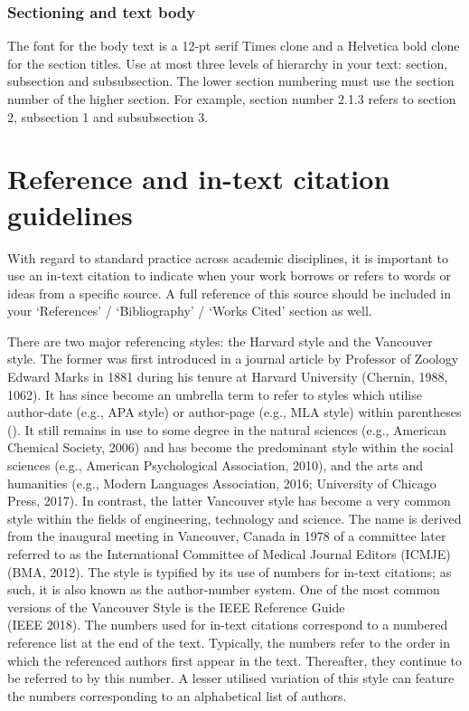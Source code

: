 \documentclass[english, 12pt, a4paper, biz, utf8, a-2b, online]{aaltothesis}
\begin{document}
\subsubsection*{Sectioning and text body}

The font for the body text is a 12-pt serif Times clone and a Helvetica bold 
clone for the section titles. Use at most three levels of hierarchy in your 
text: section, subsection and subsubsection. The lower section numbering must 
use the section number of the higher section. For example, section number 2.1.3 
refers to section 2, subsection 1 and subsubsection 3.

\clearpage
\section{Reference and in-text citation guidelines}
\label{app:reference}

With regard to standard practice across academic disciplines, it is important to
use an in-text citation to indicate when your work borrows or refers to words or
ideas from a specific source. A full reference of this source should be included
in your ‘References’ / ‘Bibliography’ / ‘Works Cited’ section as well.

There are two major referencing styles: the Harvard style and the Vancouver 
style. The former was first introduced in a journal article by Professor of 
Zoology Edward Marks in 1881 during his tenure at Harvard University (Chernin, 
1988, 1062). It has since become an umbrella term to refer to styles which 
utilise author-date (e.g., APA style) or author-page (e.g., MLA style) within 
parentheses (). It still remains in use to some degree in the natural sciences 
(e.g., American Chemical Society, 2006) and has become the predominant style 
within the social sciences (e.g., American Psychological Association, 2010), and
the arts and humanities (e.g., Modern Languages Association, 2016; University of
Chicago Press, 2017). In contrast, the latter Vancouver style has become a very 
common style within the fields of engineering, technology and science. The name 
is derived from the inaugural meeting in Vancouver, Canada in 1978 of a 
committee later referred to as the International Committee of Medical Journal 
Editors (ICMJE) (BMA, 2012). The style is typified by its use of numbers for 
in-text citations; as such, it is also known as the author-number system. One of
the most common versions of the Vancouver Style is the IEEE Reference Guide \\
(IEEE 2018). The numbers used for in-text citations correspond to a numbered 
reference list at the end of the text. Typically, the numbers refer to the order
in which the referenced authors first appear in the text. Thereafter, they 
continue to be referred to by this number. A lesser utilised variation of this 
style can feature the numbers corresponding to an alphabetical list of authors.
\end{document}
